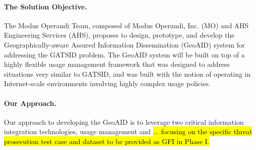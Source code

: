 \documentclass{sbir}
\begin{document}
\paragraph{The Solution Objective.} The Modus Operandi Team, composed of Modus Operandi, Inc. (MO) and AHS Engineering Services (AHS), proposes to design, prototype, and develop the Geographically-aware Assured Information Dissemination (GeoAID) system for addressing the GATSID problem. The GeoAID system will be built on top of a highly flexible usage management framework that was designed to address situations very similar to GATSID, and was built with the notion of operating in Internet-scale environments involving highly complex usage policies.

\paragraph{Our Approach.} Our approach to developing the GeoAID is to leverage two critical information integration technologies, usage management and \hl{... focusing on the specific threat prosecution test case and dataset to be provided as GFI in Phase I.}
\end{document}
